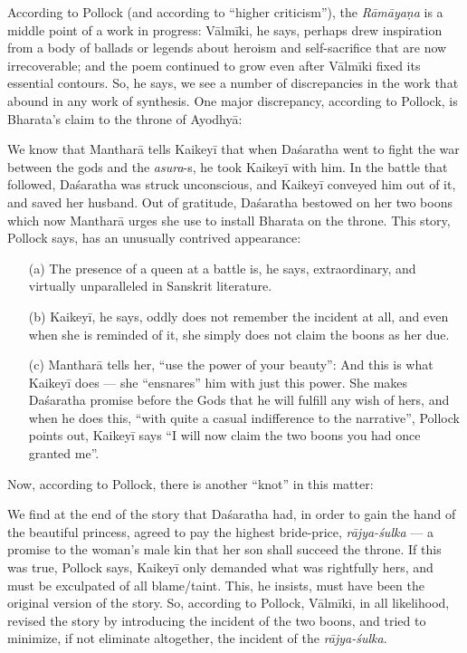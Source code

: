 According to Pollock (and according to “higher criticism”), the {\sl Rāmāyaṇa} is a middle point of a work in progress: Vālmīki, he says, perhaps drew inspiration from a body of ballads or legends about heroism and self-sacrifice that are now irrecoverable; and the poem continued to grow even after Vālmīki fixed its essential contours. So, he says, we see a number of discrepancies in the work that abound in any work of synthesis. One major discrepancy, according to Pollock, is Bharata’s claim to the throne of Ayodhyā: 

We know that Mantharā tells Kaikeyī that when Daśaratha went to fight the war between the gods and the {\sl asura}-s, he took Kaikeyī with him. In the battle that followed, Daśaratha was struck unconscious, and Kaikeyī conveyed him out of it, and saved her husband. Out of gratitude, Daśaratha bestowed on her two boons which now Mantharā urges she use to install Bharata on the throne. This story, Pollock says, has an unusually contrived appearance:
\begin{itemize} 
\itemsep=1pt
\item[(a)] The presence of a queen at a battle is, he says, extraordinary, and virtually unparalleled in Sanskrit literature.  

\item[(b)] Kaikeyī, he says, oddly does not remember the incident at all, and even when she is reminded of it, she simply does not claim the boons as her due. 

\item[(c)] Mantharā tells her, “use the power of your beauty”: And this is what Kaikeyī does --- she “ensnares” him with just this power. She makes Daśaratha promise before the Gods that he will fulfill any wish of hers, and when he does this, “with quite a casual indifference to the narrative”, Pollock points out, Kaikeyī says “I will now claim the two boons you had once granted me”. 
\end{itemize}

Now, according to Pollock, there is another “knot” in this matter: 

We find at the end of the story that Daśaratha had, in order to gain the hand of the beautiful princess, agreed to pay the highest bride-price, {\sl rājya-śulka} --- a promise to the woman’s male kin that her son shall succeed the throne. If this was true, Pollock says, Kaikeyī only demanded what was rightfully hers, and must be exculpated of all blame/taint. This, he insists, must have been the original version of the story. So, according to Pollock, Vālmīki, in all likelihood, revised the story by introducing the incident of the two boons, and tried to minimize, if not eliminate altogether, the incident of the {\sl rājya-śulka}.

